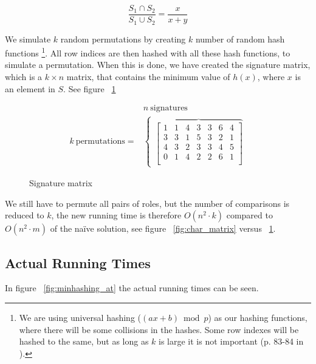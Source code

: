 \documentclass[a4paper,11pt]{article}
\begin{document}
\begin{equation*}
    \frac{S_1 \cap S_2}{S_1 \cup S_2} = \frac{x}{x+y}
\end{equation*}
    
We simulate $k$ random permutations by creating $k$ number of random hash functions \footnote{We are using universal hashing ($(ax + b) \bmod p$) as our hashing functions, where there will be some collisions in the hashes. Some row indexes will be hashed to the same, but as long as $k$ is large it is not important (p. 83-84 in \cite{book:mmds}).}. All row indices are then hashed with all these hash functions, to simulate a permutation. When this is done, we have created the signature matrix, which is a $k\times n$ matrix, that contains the minimum value of $h(x)$, where $x$ is an element in $S$. See figure ~\ref{fig:signature_matrix}\\

\begin{figure}[!htpb]
    \begin{eqnarray*}
     & n \ \text{signatures} \\
     k \ \text{permutations} = & 
        \begin{cases}
        \overbrace{
        \begin{bmatrix}
            1 & 1 & 4 & 3 & 3 & 6 & 4\\
            3 & 3 & 1 & 5 & 3 & 2 & 1\\
            4 & 3 & 2 & 3 & 3 & 4 & 5\\
            0 & 1 & 4 & 2 & 2 & 6 & 1\\
        \end{bmatrix} 
        } 
        \end{cases}
    \end{eqnarray*}
    \caption{Signature matrix}
    \label{fig:signature_matrix}
\end{figure}

We still have to permute all pairs of roles, but the number of comparisons is reduced to $k$, the new running time is therefore $O(n^2 \cdot k)$ compared to $O(n^2 \cdot m)$ of the naïve solution, see figure ~\ref{fig:char_matrix} versus ~\ref{fig:signature_matrix}.

\subsection{Actual Running Times}
In figure ~\ref{fig:minhashing_at} the actual running times can be seen.
\end{document}
